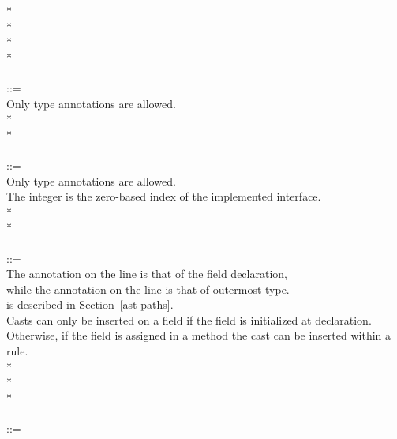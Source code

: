 \documentclass{article}
\begin{document}
\begin{tabbing}
\qquad        {}* \\
\qquad        {}* \\
\qquad        {}*  \\
\qquad        {}* \\
\\
 ::= \\
\qquad    \bnfcmt Only type annotations are allowed.\\
\qquad    {} \bnflit{:} * \lineend  \\
\qquad        {}* \\
\\
 ::= \\
\qquad    \bnfcmt Only type annotations are allowed.\\
\qquad    \bnfcmt The integer is the zero-based index of the implemented interface. \\
\qquad    {}  \bnflit{:} * \lineend  \\
\qquad        {}* \\
\\
 ::= \\
\qquad    \bnfcmt The annotation on the  line is that of the field declaration, \\
\qquad    \bnfcmt while the annotation on the  line is that of outermost type. \\
\qquad    \bnfcmt {} is described in Section~\ref{ast-paths}. \\
\qquad    \bnfcmt Casts can only be inserted on a field if the field is initialized at declaration. \\
\qquad    \bnfcmt Otherwise, if the field is assigned in a method the cast can be inserted within a \\
\qquad    \bnfcmt {} rule. \\
\qquad    {}  \bnflit{:} * \lineend  \\
\qquad        {}* \\
\qquad        {}* \\
\\
 ::= \\

\end{tabbing}
\end{document}
